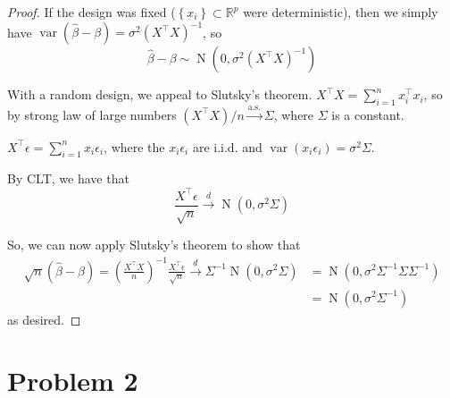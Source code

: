 \documentclass[letterpaper]{article}
\begin{document}
\begin{enumerate}[(a)]
\begin{proof}
    If the design was fixed ($\left\{x_i\right\} \subset \mathbb{R}^p$ were
    deterministic), then we simply have
    $\operatorname{var}\left(\hat{\beta} - \beta\right) = \sigma^2\left(X^\top
      X\right)^{-1}$, so
    \begin{equation*}
      \hat{\beta} - \beta \sim \operatorname{N}\left(0, \sigma^2\left(X^\top X\right)^{-1}\right)
    \end{equation*}
    

    With a random design, we appeal to Slutsky's theorem.
    $X^\top X = \sum_{i=1}^n x_i^\top x_i$, so by strong law of large numbers
    $\left(X^\top X\right)/n \xrightarrow{\text{a.s.}} \Sigma$, where $\Sigma$
    is a constant.

    $X^\top\epsilon = \sum_{i=1}^n x_i\epsilon_i$, where the $x_i\epsilon_i$ are
    i.i.d. and $\operatorname{var}\left(x_i\epsilon_i\right) = \sigma^2\Sigma$.

    By CLT, we have that
    \begin{equation*}
      \frac{X^\top\epsilon}{\sqrt{n}}
        \xrightarrow{d} \operatorname{N}\left(0, \sigma^2\Sigma\right)
    \end{equation*}

    So, we can now apply Slutsky's theorem to show that
    \begin{align*}
      \sqrt{n}\left(\hat{\beta} - \beta\right)
      =
      \left(\frac{X^\top X}{n}\right)^{-1}\frac{X^\top\epsilon}{\sqrt{n}}
      \xrightarrow{d} \Sigma^{-1}\operatorname{N}\left(0, \sigma^2\Sigma\right)
      &= \operatorname{N}\left(0, \sigma^2\Sigma^{-1}\Sigma\Sigma^{-1}\right) \\
      &= \operatorname{N}\left(0, \sigma^2\Sigma^{-1}\right)
    \end{align*}
    as desired.
  \end{proof}
\end{enumerate}

\section*{Problem 2}
\end{document}
